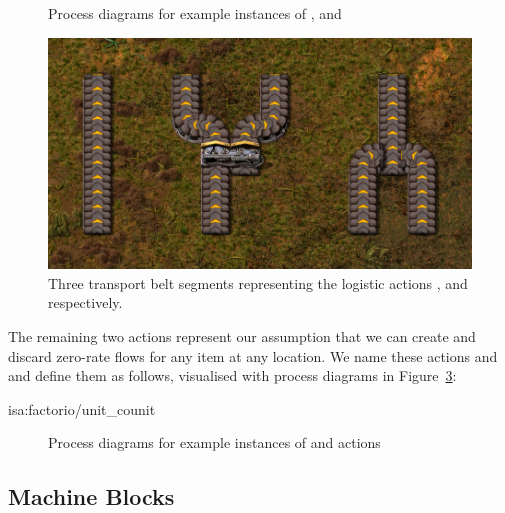 \documentclass[class=smolathesis,crop=false]{standalone}
\begin{document}
\begin{figure}[htbp]
  \centering
  
  \caption{Process diagrams for example instances of ,  and }
  \label{fig:move-split-merge}
\end{figure}

\begin{figure}[htbp]
  \centering
  \includegraphics[width=\textwidth]{img/factorio_move-split-merge.png}
  \caption{Three transport belt segments representing the logistic actions ,  and  respectively.}
  \label{fig:factorio_move-split-merge}
\end{figure}

The remaining two actions represent our assumption that we can create and discard zero-rate flows for any item at any location.
We name these actions  and  and define them as follows, visualised with process diagrams in Figure~\ref{fig:unit-counit}:
\begin{isadef}{isa:factorio/unit_counit}
  
\end{isadef}

\begin{figure}[htb]
  \centering
  
  \caption{Process diagrams for example instances of  and  actions}
  \label{fig:unit-counit}
\end{figure}

\subsection{Machine Blocks}
\label{sec:cases/factorio/mach}
\end{document}
